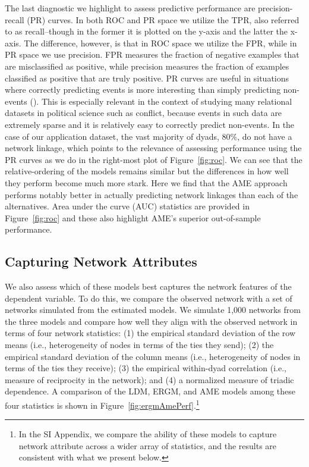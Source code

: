 \documentclass[12pt,pdflatex]{elsarticle}
\begin{document}
The last diagnostic we highlight to assess predictive performance are precision-recall (PR) curves. In both ROC and PR space we utilize the TPR, also referred to as recall--though in the former it is plotted on the y-axis and the latter the x-axis. The difference, however, is that in ROC space we utilize the FPR, while in PR space we use precision. FPR measures the fraction of negative examples that are misclassified as positive, while precision measures the fraction of examples classified as positive that are truly positive. PR curves are useful in situations where correctly predicting events is more interesting than simply predicting non-events (\citealt{davis:goadrich:2006}). This is especially relevant in the context of studying many relational datasets in political science such as conflict, because events in such data are extremely sparse and it is relatively easy to correctly predict non-events. In the case of our application dataset, the vast majority of dyads, 80\%, do not have a network linkage, which points to the relevance of assessing performance using the PR curves as we do in the right-most plot of Figure~\ref{fig:roc}. We can see that the relative-ordering of the models remains similar but the differences in how well they perform become much more stark. Here we find that the AME approach performs notably better in actually predicting network linkages than each of the alternatives. Area under the curve (AUC) statistics are provided in Figure~\ref{fig:roc} and these also highlight AME's superior out-of-sample performance.


\FloatBarrier

\subsection*{Capturing Network Attributes}

We also assess which of these models best captures the network features of the dependent variable. To do this, we compare the observed network with a set of networks simulated from the estimated models. We simulate 1,000 networks from the three models and compare how well they align with the observed network in terms of four network statistics: (1) the empirical standard deviation of the row means (i.e., heterogeneity of nodes in terms of the ties they send); (2) the empirical standard deviation of the column means (i.e., heterogeneity of nodes in terms of the ties they receive); (3) the empirical within-dyad correlation (i.e., measure of reciprocity in the network); and (4) a normalized measure of triadic dependence. A comparison of the LDM, ERGM, and AME models among these four statistics is shown in Figure~\ref{fig:ergmAmePerf}.\footnote{In the SI Appendix, we compare the ability of these models to capture network attribute across a wider array of statistics, and the results are consistent with what we present below.}
\end{document}
